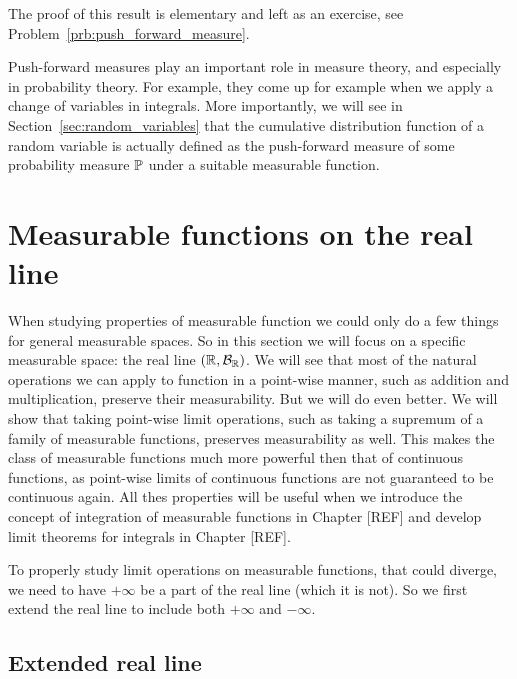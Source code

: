 The proof of this result is elementary and left as an exercise, see Problem~\ref{prb:push_forward_measure}. 

Push-forward measures play an important role in measure theory, and especially in probability theory. For example, they come up for example when we apply a change of variables in integrals. More importantly, we will see in Section~\ref{sec:random_variables} that the cumulative distribution function of a random variable is actually defined as the push-forward measure of some probability measure $\mathbb P$ under a suitable measurable function.

\section{Measurable functions on the real line}\label{sec:measurable_functions_real_line}

When studying properties of measurable function we could only do a few things for general measurable spaces. So in this section we will focus on a specific measurable space: the real line $(\mathbb R, \mathcal B_{\mathbb R})$. We will see that most of the natural operations we can apply to function in a point-wise manner, such as addition and multiplication, preserve their measurability. But we will do even better. We will show that taking point-wise limit operations, such as taking a supremum of a family of measurable functions, preserves measurability as well. This makes the class of measurable functions much more powerful then that of continuous functions, as point-wise limits of continuous functions are not guaranteed to be continuous again. All thes properties will be useful when we introduce the concept of integration of measurable functions in Chapter [REF] and develop limit theorems for integrals in Chapter [REF].

To properly study limit operations on measurable functions, that could diverge, we need to have $+\infty$ be a part of the real line (which it is not). So we first extend the real line to include both $+\infty$ and $-\infty$.

\subsection{Extended real line}

